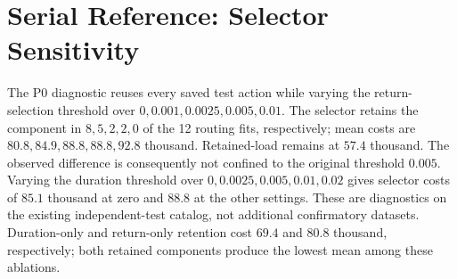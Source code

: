 \section{Serial Reference: Selector Sensitivity}
The P0 diagnostic reuses every saved test action while varying the return-selection threshold over $0,0.001,0.0025,0.005,0.01$. The selector retains the component in $8,5,2,2,0$ of the 12 routing fits, respectively; mean costs are $80.8,84.9,88.8,88.8,92.8$ thousand. Retained-load remains at $57.4$ thousand. The observed difference is consequently not confined to the original threshold $0.005$. Varying the duration threshold over $0,0.0025,0.005,0.01,0.02$ gives selector costs of $85.1$ thousand at zero and $88.8$ at the other settings. These are diagnostics on the existing independent-test catalog, not additional confirmatory datasets. Duration-only and return-only retention cost $69.4$ and $80.8$ thousand, respectively; both retained components produce the lowest mean among these ablations.
